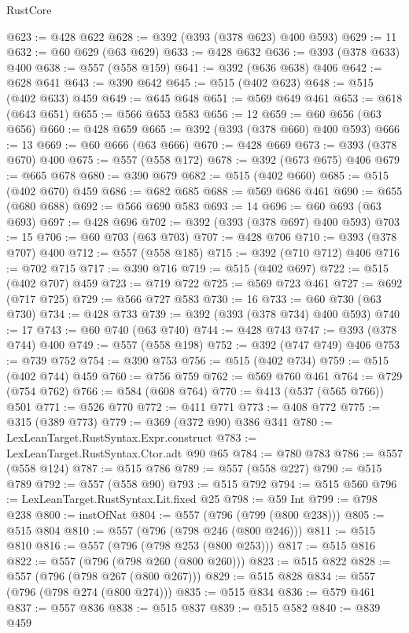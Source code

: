 \begin{lexlean}{RustCore}
\begin{coremodule}
@623 := @428 @622
@628 := @392 (@393 (@378 @623) @400 @593)
@629 := 11
@632 := @60 @629 (@63 @629)
@633 := @428 @632
@636 := @393 (@378 @633) @400
@638 := @557 (@558 @159)
@641 := @392 (@636 @638) @406
@642 := @628 @641
@643 := @390 @642
@645 := @515 (@402 @623)
@648 := @515 (@402 @633) @459
@649 := @645 @648
@651 := @569 @649 @461
@653 := @618 (@643 @651)
@655 := @566 @653 @583
@656 := 12
@659 := @60 @656 (@63 @656)
@660 := @428 @659
@665 := @392 (@393 (@378 @660) @400 @593)
@666 := 13
@669 := @60 @666 (@63 @666)
@670 := @428 @669
@673 := @393 (@378 @670) @400
@675 := @557 (@558 @172)
@678 := @392 (@673 @675) @406
@679 := @665 @678
@680 := @390 @679
@682 := @515 (@402 @660)
@685 := @515 (@402 @670) @459
@686 := @682 @685
@688 := @569 @686 @461
@690 := @655 (@680 @688)
@692 := @566 @690 @583
@693 := 14
@696 := @60 @693 (@63 @693)
@697 := @428 @696
@702 := @392 (@393 (@378 @697) @400 @593)
@703 := 15
@706 := @60 @703 (@63 @703)
@707 := @428 @706
@710 := @393 (@378 @707) @400
@712 := @557 (@558 @185)
@715 := @392 (@710 @712) @406
@716 := @702 @715
@717 := @390 @716
@719 := @515 (@402 @697)
@722 := @515 (@402 @707) @459
@723 := @719 @722
@725 := @569 @723 @461
@727 := @692 (@717 @725)
@729 := @566 @727 @583
@730 := 16
@733 := @60 @730 (@63 @730)
@734 := @428 @733
@739 := @392 (@393 (@378 @734) @400 @593)
@740 := 17
@743 := @60 @740 (@63 @740)
@744 := @428 @743
@747 := @393 (@378 @744) @400
@749 := @557 (@558 @198)
@752 := @392 (@747 @749) @406
@753 := @739 @752
@754 := @390 @753
@756 := @515 (@402 @734)
@759 := @515 (@402 @744) @459
@760 := @756 @759
@762 := @569 @760 @461
@764 := @729 (@754 @762)
@766 := @584 (@608 @764)
@770 := @413 (@537 (@565 @766)) @501
@771 := @526 @770
@772 := @411 @771
@773 := @408 @772
@775 := @315 (@389 @773)
@779 := @369 (@372 @90) @386 @341
@780 := LexLeanTarget.RustSyntax.Expr.construct
@783 := LexLeanTarget.RustSyntax.Ctor.adt @90 @65
@784 := @780 @783
@786 := @557 (@558 @124)
@787 := @515 @786
@789 := @557 (@558 @227)
@790 := @515 @789
@792 := @557 (@558 @90)
@793 := @515 @792
@794 := @515 @560
@796 := LexLeanTarget.RustSyntax.Lit.fixed @25
@798 := @59 Int
@799 := @798 @238
@800 := instOfNat
@804 := @557 (@796 (@799 (@800 @238)))
@805 := @515 @804
@810 := @557 (@796 (@798 @246 (@800 @246)))
@811 := @515 @810
@816 := @557 (@796 (@798 @253 (@800 @253)))
@817 := @515 @816
@822 := @557 (@796 (@798 @260 (@800 @260)))
@823 := @515 @822
@828 := @557 (@796 (@798 @267 (@800 @267)))
@829 := @515 @828
@834 := @557 (@796 (@798 @274 (@800 @274)))
@835 := @515 @834
@836 := @579 @461
@837 := @557 @836
@838 := @515 @837
@839 := @515 @582
@840 := @839 @459

\end{coremodule}
\end{lexlean}
